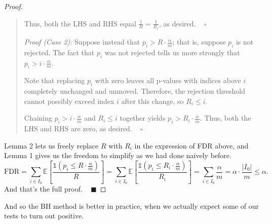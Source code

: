 \begin{proof}
\begin{quote}
        Thus, both the LHS and RHS equal
        $\frac{1}{R} = \frac{1}{R_i}$, as desired. ~ $\square$

        \emph{Proof (Case 2):}
        Suppose instead that $p_i > R \cdot \frac{\alpha}{m}$;
        that is, suppose $p_i$ is not rejected.
        The fact that $p_i$ was not rejected
        tells us more strongly that $p_i > i \cdot \frac{\alpha}{m}$.

        Note that replacing $p_i$ with zero
        leaves all p-values with indices above $i$
        completely unchanged and unmoved.
        Therefore, the rejection threshold cannot possibly
        exceed index $i$ after this change, so $R_i \leq i$.

        Chaining $p_i > i \cdot \frac{\alpha}{m}$ and $R_i \leq i$ together
        yields $p_i > R_i \cdot \frac{\alpha}{m}$.
        Thus, both the LHS and RHS are zero, as desired. ~ $\square$
    \end{quote}
    Lemma 2 lets us freely replace $R$ with $R_i$
    in the expression of FDR above,
    and Lemma 1 gives us the freedom to simplify
    as we had done naively before.
    \[
        \text{FDR}
        = \sum_{i \in I_0} \mathbb{E}\left[
            \frac{\mathds{1}\left(
                p_i \leq R \cdot \frac{\alpha}{m}
            \right)}{R}
        \right]
        = \sum_{i \in I_0} \mathbb{E}\left[
            \frac{\mathds{1}\left(
                p_i \leq R_i \cdot \frac{\alpha}{m}
            \right)}{R_i}
        \right]
        = \sum_{i \in I_0} \frac{\alpha}{m}
        = \alpha \cdot \frac{|I_0|}{m} \leq \alpha.
    \]
    And that's the full proof. ~ $\blacksquare$
\end{proof}

And so the BH method is better in practice,
when we actually expect some of our tests to turn out positive.

